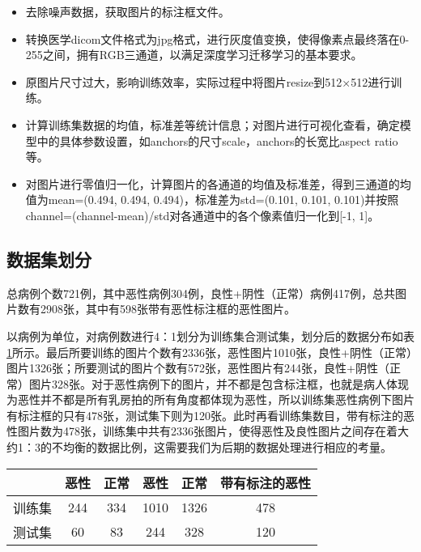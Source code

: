 \begin{itemize}
	\item 去除噪声数据，获取图片的标注框文件。
	\item 转换医学dicom文件格式为jpg格式，进行灰度值变换，使得像素点最终落在0-255之间，拥有RGB三通道，以满足深度学习迁移学习的基本要求。
	\item 原图片尺寸过大，影响训练效率，实际过程中将图片resize到512×512进行训练。
	\item 计算训练集数据的均值，标准差等统计信息；对图片进行可视化查看，确定模型中的具体参数设置，如anchors的尺寸scale，anchors的长宽比aspect ratio等。
	\item 对图片进行零值归一化，计算图片的各通道的均值及标准差，得到三通道的均值为mean=(0.494, 0.494, 0.494)，标准差为std=(0.101,  0.101,  0.101)并按照channel=(channel-mean)/std对各通道中的各个像素值归一化到[-1, 1]。
\end{itemize}

\subsection{数据集划分}
总病例个数721例，其中恶性病例304例，良性+阴性（正常）病例417例，总共图片数有2908张，其中有598张带有恶性标注框的恶性图片。

以病例为单位，对病例数进行4：1划分为训练集合测试集，划分后的数据分布如表\ref{tab:data_set_split}所示。最后所要训练的图片个数有2336张，恶性图片1010张，良性+阴性（正常）图片1326张；所要测试的图片个数有572张，恶性图片有244张，良性+阴性（正常）图片328张。对于恶性病例下的图片，并不都是包含标注框，也就是病人体现为恶性并不都是所有乳房拍的所有角度都体现为恶性，所以训练集恶性病例下图片有标注框的只有478张，测试集下则为120张。此时再看训练集数目，带有标注的恶性图片数为478张，训练集中共有2336张图片，使得恶性及良性图片之间存在着大约1：3的不均衡的数据比例，这需要我们为后期的数据处理进行相应的考量。

\begin{table}[!htbp]
    \label{tab:data_set_split}
    \centering
    \footnotesize%
    \setlength{\tabcolsep}{4pt}%
    \renewcommand{\arraystretch}{1.2}%
    \begin{tabular}{c|c|c|c|c|c}
        \hline       
         &恶性 &正常 &恶性 &正常 &带有标注的恶性\\
        \hline
        训练集 &244 &334 &1010 &1326 &478 \\
        \hline
        测试集 &60 &83 &244 &328 &120\\
        \hline
    \end{tabular}
\end{table}

